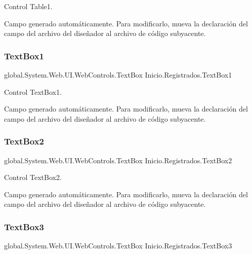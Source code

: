 Control Table1. 

Campo generado automáticamente. Para modificarlo, mueva la declaración del campo del archivo del diseñador al archivo de código subyacente. \mbox{\label{classInicio_1_1Registrados_a2ec529c41bccbe1d45b53e29aad8d1f4}} 
\subsubsection{\texorpdfstring{TextBox1}{TextBox1}}
{\footnotesize\ttfamily global.\+System.\+Web.\+U\+I.\+Web\+Controls.\+Text\+Box Inicio.\+Registrados.\+Text\+Box1\hspace{0.3cm}{\ttfamily [protected]}}



Control Text\+Box1. 

Campo generado automáticamente. Para modificarlo, mueva la declaración del campo del archivo del diseñador al archivo de código subyacente. \mbox{\label{classInicio_1_1Registrados_a14706b4c2eeec2fe1d93f7d0ae00993c}} 
\subsubsection{\texorpdfstring{TextBox2}{TextBox2}}
{\footnotesize\ttfamily global.\+System.\+Web.\+U\+I.\+Web\+Controls.\+Text\+Box Inicio.\+Registrados.\+Text\+Box2\hspace{0.3cm}{\ttfamily [protected]}}



Control Text\+Box2. 

Campo generado automáticamente. Para modificarlo, mueva la declaración del campo del archivo del diseñador al archivo de código subyacente. \mbox{\label{classInicio_1_1Registrados_a42dd2c03767d9a49a113c1c4e864d790}} 
\subsubsection{\texorpdfstring{TextBox3}{TextBox3}}
{\footnotesize\ttfamily global.\+System.\+Web.\+U\+I.\+Web\+Controls.\+Text\+Box Inicio.\+Registrados.\+Text\+Box3\hspace{0.3cm}{\ttfamily [protected]}}



